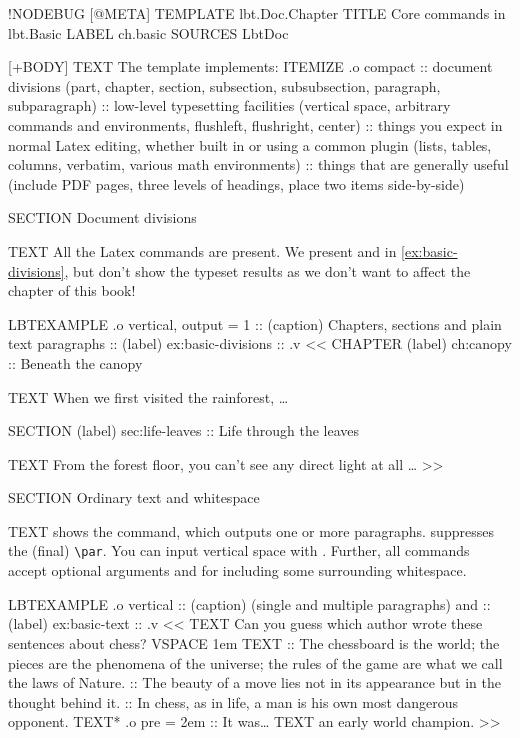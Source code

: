 \begin{lbt}
  !NODEBUG
  [@META]
    TEMPLATE lbt.Doc.Chapter
    TITLE Core commands in lbt.Basic
    LABEL ch.basic
    SOURCES LbtDoc

  [+BODY]
    TEXT The  template implements:
    ITEMIZE .o compact
    :: document divisions (part, chapter, section, subsection, subsubsection, paragraph, subparagraph)
    :: low-level typesetting facilities (vertical space, arbitrary commands and environments, flushleft, flushright, center)
    :: things you expect in normal Latex editing, whether built in or using a common plugin (lists, tables, columns, verbatim, various math environments)
    :: things that are generally useful (include PDF pages, three levels of headings, place two items side-by-side)

    SECTION Document divisions

    TEXT All the Latex commands are present. We present  and  in \cref{ex:basic-divisions}, but don't show the typeset results as we don't want to affect the chapter of this book!

    LBTEXAMPLE .o vertical, output = 1
    :: (caption) Chapters, sections and plain text paragraphs
    :: (label) ex:basic-divisions
    :: .v <<
      CHAPTER (label) ch:canopy :: Beneath the canopy

      TEXT When we first visited the rainforest, \dots

      SECTION (label) sec:life-leaves :: Life through the leaves

      TEXT From the forest floor, you can't see any direct light at all \dots
    >>

    SECTION Ordinary text and whitespace

    TEXT  shows the  command, which outputs one or more paragraphs.  suppresses the (final) \verb|\par|. You can input vertical space with . Further, all commands accept optional arguments  and  for including some surrounding whitespace.

    LBTEXAMPLE .o vertical
    :: (caption)  (single and multiple paragraphs) and 
    :: (label) ex:basic-text
    :: .v <<
      TEXT Can you guess which author wrote these sentences about chess?
      VSPACE 1em
      TEXT
      :: The chessboard is the world; the pieces are the phenomena of the universe; the rules of the game are what we call the laws of Nature.
      :: The beauty of a move lies not in its appearance but in the thought behind it.
      :: In chess, as in life, a man is his own most dangerous opponent.
      TEXT* .o pre = 2em :: It was\dots
      TEXT an early world champion.
    >>


\end{lbt}
